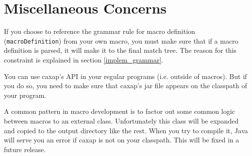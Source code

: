 \section{Miscellaneous Concerns}

If you choose to reference the grammar rule for macro definition
(\texttt{macroDefinition}) from your own macro, you must make sure that if a
macro definition is parsed, it will make it to the final match tree. The reason
for this constraint is explained in section \ref{implem_grammar}.

You can use caxap's API in your regular programs (i.e. outside of macros). But
if you do so, you need to make sure that caxap's jar file appears on the
classpath of your program.

A common pattern in macro development is to factor out some common logic between
macros to an external class. Unfortunately this class will be expanded and
copied to the output directory like the rest. When you try to compile it, Java
will serve you an error if caxap is not on your classpath. This will be fixed in
a future release.
